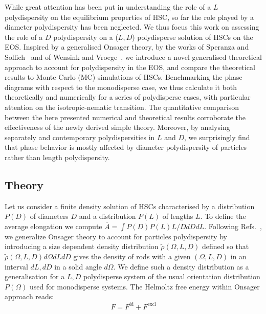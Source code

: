 \documentclass[journal=jacsat,manuscript=article]{achemso}
\begin{document}
While great attention has been put in understanding the role of a $L$ polydispersity on the equilibrium properties of HSC, so far the  role played by  a diameter polydispersity has been neglected. We thus focus this work on assessing the role of a $D$ polydispersity on a ($L,D$) polydisperse solution of HSCs on the EOS.
Inspired by a generalised Onsager theory,  by the works of Speranza and Sollich~\cite{Speranza2002}
and of Wensink and Vroege~\cite{Wensink2003}, we introduce a novel  generalised theoretical approach to account for polydispersity in the EOS, and compare the theoretical results to Monte Carlo  (MC) simulations of HSCs. 
Benchmarking the phase diagrams with  respect to the monodisperse case, we thus calculate it both theoretically and numerically for a series of polydisperse cases, with particular attention on the  isotropic-nematic transition.
The quantitative comparison between the here presented numerical and theoretical results corroborate the effectiveness of the newly derived simple theory.
Moreover, by analysing separately and contemporary  polydispersities in $L$ and $D$, we surprisingly find that phase behavior is mostly affected by diameter polydispersity of particles rather than length polydispersity. 


\subsection{Theory} \label{sec:Theory}
Let us consider a finite density solution of HSCs  characterised by a distribution $P(D)$ of diameters $D$ and a distribution $P(L)$ of lengths $L$.  To define the average elongation we compute $\overline{A}= \int P(D) P(L) L/D dD dL$.
Following Refs.~\cite{Speranza2002,Wensink2003}, we generalize Onsager theory to account for particles polydispersity by introducing a 
size dependent density distribution $\tilde{\rho}(\Omega,L,D)$ defined so that $\tilde{\rho}(\Omega,L,D)d\Omega dL dD $ gives the density of rods with a given $(\Omega,L,D)$ in an interval $dL, dD$ in a solid angle  $d\Omega$. We define such a density distribution as a generalisation for a $L,D$ polydisperse system of the usual orientation distribution $P(\Omega)$ used for monodisperse systems.
The Helmoltz free energy within Onsager approach reads:
\begin{equation}
	F = F^\mathrm{id} + F^\mathrm{excl}
\end{equation}
\end{document}
